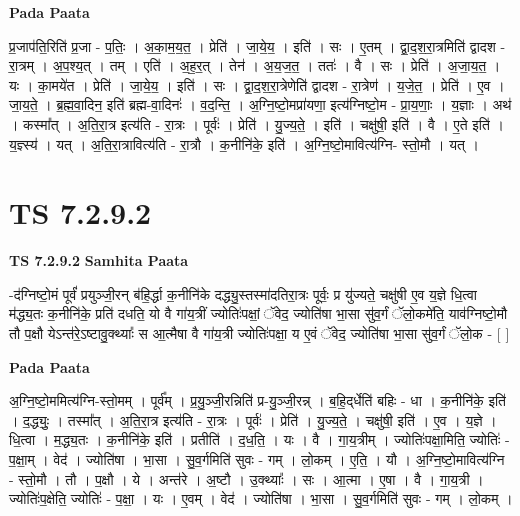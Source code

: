 \documentclass[17pt]{extarticle}
\begin{document}
\textbf{Pada Paata} \newline

प्र॒जाप॑ति॒रिति॑ प्र॒जा - प॒तिः॒ । अ॒का॒म॒य॒त॒ । प्रेति॑ । जा॒ये॒य॒ । इति॑ । सः । ए॒तम् । द्वा॒द॒श॒रा॒त्रमिति॑ द्वादश - रा॒त्रम् । अ॒प॒श्य॒त् । तम् । एति॑ । अ॒ह॒र॒त् । तेन॑ । अ॒य॒ज॒त॒ । ततः॑ । वै । सः । प्रेति॑ । अ॒जा॒य॒त॒ । यः । का॒मये॑त । प्रेति॑ । जा॒ये॒य॒ । इति॑ । सः । द्वा॒द॒श॒रा॒त्रेणेति॑ द्वादश - रा॒त्रेण॑ । य॒जे॒त॒ । प्रेति॑ । ए॒व । जा॒य॒ते॒ । ब्र॒ह्म॒वा॒दिन॒ इति॑ ब्रह्म-वा॒दिनः॑ । व॒द॒न्ति॒ । अ॒ग्नि॒ष्टो॒मप्रा॑यणा॒ इत्य॑ग्निष्टो॒म - प्रा॒य॒णाः॒ । य॒ज्ञाः । अथ॑ । कस्मा᳚त् । अ॒ति॒रा॒त्र इत्य॑ति - रा॒त्रः । पूर्वः॑ । प्रेति॑ । यु॒ज्य॒ते॒ । इति॑ । चक्षु॑षी॒ इति॑ । वै । ए॒ते इति॑ । य॒ज्ञ्स्य॑ । यत् । अ॒ति॒रा॒त्रावित्य॑ति - रा॒त्रौ । क॒नीनि॑के॒ इति॑ । अ॒ग्नि॒ष्टो॒मावित्य॑ग्नि- स्तो॒मौ । यत् ।  \newline





\section{ TS 7.2.9.2 }

\textbf{TS 7.2.9.2 } \newline
\textbf{Samhita Paata} \newline

-द॑ग्निष्टो॒मं पूर्वं॑ प्रयुञ्जी॒रन् ब॑हि॒र्द्धा क॒नीनि॑के दद्ध्यु॒स्तस्मा॑दतिरा॒त्रः पूर्वः॒ प्र यु॑ज्यते॒ चक्षु॑षी ए॒व य॒ज्ञे धि॒त्वा म॑द्ध्य॒तः क॒नीनि॑के॒ प्रति॑ दधति॒ यो वै गा॑य॒त्रीं ज्योतिः॑पक्षां॒ ॅवेद॒ ज्योति॑षा भा॒सा सु॑व॒र्गं ॅलो॒कमे॑ति॒ याव॑ग्निष्टो॒मौ तौ प॒क्षौ येऽन्त॑रे॒ऽष्टावु॒क्थ्याः᳚ स आ॒त्मैषा वै गा॑य॒त्री ज्योतिः॑पक्षा॒ य ए॒वं ॅवेद॒ ज्योति॑षा भा॒सा सु॑व॒र्गं ॅलो॒क - [  ] \newline

\textbf{Pada Paata} \newline

अ॒ग्नि॒ष्टो॒ममित्य॑ग्नि-स्तो॒मम् । पूर्व᳚म् । प्र॒यु॒ञ्जी॒रन्निति॑ प्र-यु॒ञ्जी॒रन्न् । ब॒हि॒द्‌र्धेति॑ बहिः - धा । क॒नीनि॑के॒ इति॑ । द॒द्ध्युः॒ । तस्मा᳚त् । अ॒ति॒रा॒त्र इत्य॑ति - रा॒त्रः । पूर्वः॑ । प्रेति॑ । यु॒ज्य॒ते॒ । चक्षु॑षी॒ इति॑ । ए॒व । य॒ज्ञे । धि॒त्वा । म॒द्ध्य॒तः । क॒नीनि॑के॒ इति॑ । प्रतीति॑ । द॒ध॒ति॒ । यः । वै । गा॒य॒त्रीम् । ज्योतिः॑पक्षा॒मिति॒ ज्योतिः॑ - प॒क्षा॒म् । वेद॑ । ज्योति॑षा । भा॒सा । सु॒व॒र्गमिति॑ सुवः - गम् । लो॒कम् । ए॒ति॒ । यौ । अ॒ग्नि॒ष्टो॒मावित्य॑ग्नि - स्तो॒मौ । तौ । प॒क्षौ । ये । अन्त॑रे । अ॒ष्टौ । उ॒क्थ्याः᳚ । सः । आ॒त्मा । ए॒षा । वै । गा॒य॒त्री । ज्योतिः॑प॒क्षेति॒ ज्योतिः॑ - प॒क्षा॒ । यः । ए॒वम् । वेद॑ । ज्योति॑षा । भा॒सा । सु॒व॒र्गमिति॑ सुवः - गम् । लो॒कम् ।  \newline
\end{document}
